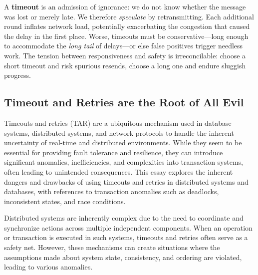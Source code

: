 \documentclass[../OAE-SPEC-MAIN.tex]{subfiles}
\begin{document}
A \textbf{timeout} is an admission of ignorance: we do not know whether the message was lost or merely late.  We therefore \emph{speculate} by retransmitting.  Each additional round inflates network load, potentially exacerbating the congestion that caused the delay in the first place.  Worse, timeouts must be conservative---long enough to accommodate the \emph{long tail} of delays---or else false positives trigger needless work.  The tension between responsiveness and safety is irreconcilable: choose a short timeout and risk spurious resends, choose a long one and endure sluggish progress.


\subsection*{Timeout and Retries are the Root of All Evil}

Timeouts and retries (TAR) are a ubiquitous mechanism used in database systems, distributed systems, and network protocols to handle the inherent uncertainty of real-time and distributed environments. While they seem to be essential for providing fault tolerance and resilience, they can introduce significant anomalies, inefficiencies, and complexities into transaction systems, often leading to unintended consequences. This essay explores the inherent dangers and drawbacks of using timeouts and retries in distributed systems and databases, with references to transaction anomalies such as deadlocks, inconsistent states, and race conditions.

Distributed systems are inherently complex due to the need to coordinate and synchronize actions across multiple independent components. When an operation or transaction is executed in such systems, timeouts and retries often serve as a safety net. However, these mechanisms can create situations where the assumptions made about system state, consistency, and ordering are violated, leading to various anomalies.
\end{document}
